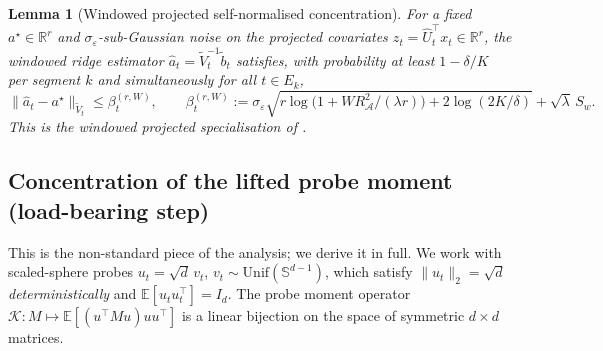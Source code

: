 \documentclass{article}
\newcommand{\R}{\mathbb{R}}
\newcommand{\E}{\mathbb{E}}
\newcommand{\cA}{\mathcal{A}}
\newtheorem{lemma}{Lemma}
\begin{document}
\begin{lemma}[Windowed projected self-normalised concentration]
\label{lem:self_norm}
For a fixed $a^\star\in\R^r$ and $\sigma_\varepsilon$-sub-Gaussian
noise on the projected covariates $z_t=\widehat U_t^\top x_t\in\R^r$,
the windowed ridge estimator
$\widehat a_t=\widetilde V_t^{-1}\widetilde b_t$ satisfies, with
probability at least $1-\delta/K$ per segment $k$ and simultaneously
for all $t\in E_k$,
\[
\|\widehat a_t-a^\star\|_{\widetilde V_t}\le \beta_t^{(r,W)},
\qquad
\beta_t^{(r,W)} := \sigma_\varepsilon\sqrt{r\log\bigl(1+WR_\cA^2/(\lambda r)\bigr)+2\log(2K/\delta)}+\sqrt\lambda\,S_w.
\]
This is the windowed projected specialisation of
\citet[Thm.~1,~2]{abbasi2011improved}.
\end{lemma}

\subsection{Concentration of the lifted probe moment (load-bearing step)}
\label{app:concentration_proof}

This is the non-standard piece of the analysis; we derive it in full.
We work with scaled-sphere probes $u_t = \sqrt d\,v_t$,
$v_t\sim\mathrm{Unif}(\mathbb S^{d-1})$, which satisfy
$\|u_t\|_2 = \sqrt d$ \emph{deterministically} and $\E[u_tu_t^\top] = I_d$.
The probe moment operator
$\mathcal K: M\mapsto\E[(u^\top Mu)uu^\top]$ is a linear bijection
on the space of symmetric $d\times d$ matrices.
\end{document}
